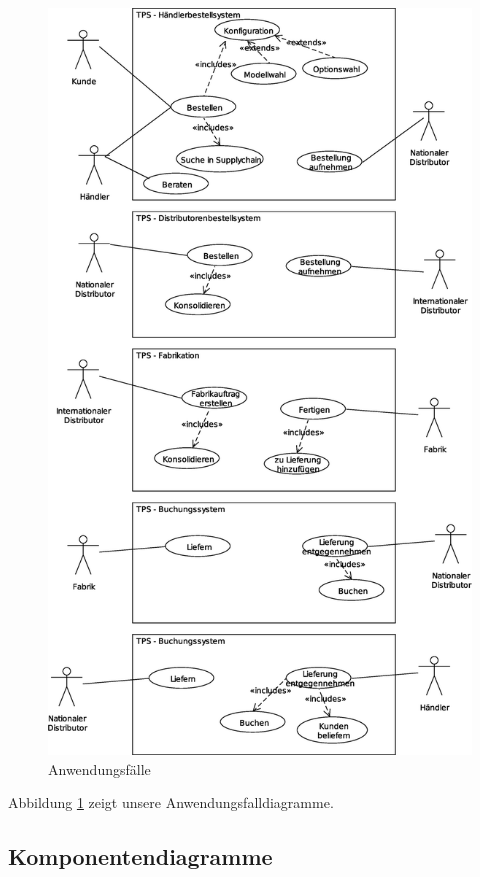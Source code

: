 \documentclass[a4paper,10pt,left=1.5cm,right=1.5cm,top=1.5cm,bottom=1.5cm]{article}
\begin{document}
\begin{figure}[htb]
 \begin{center}
   \includegraphics[width=1\textwidth]{usecases.eps}
    \caption{Anwendungsfälle}
    \label{anwendungsfalldiagramme}
  \end{center}
\end{figure}

Abbildung \ref{anwendungsfalldiagramme} zeigt unsere Anwendungsfalldiagramme.

\subsection{Komponentendiagramme}
\end{document}
